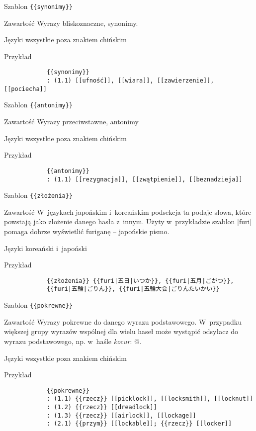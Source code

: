 \spacer
\begin{opis}
	\item[Szablon] \verb|{{synonimy}}|
	\item[Zawartość] Wyrazy bliskoznaczne, synonimy.
	\item[Języki] wszystkie poza znakiem chińskim
	\item[Przykład]
		\begin{verbatim}
			{{synonimy}}
			: (1.1) [[ufność]], [[wiara]], [[zawierzenie]], [[pociecha]]
		\end{verbatim}
\end{opis}
\spacer
\begin{opis}
	\item[Szablon] \verb|{{antonimy}}|
	\item[Zawartość] Wyrazy przeciwstawne, antonimy
	\item[Języki] wszystkie poza znakiem chińskim
	\item[Przykład]
		\begin{verbatim}
			{{antonimy}}
			: (1.1) [[rezygnacja]], [[zwątpienie]], [[beznadzieja]]
		\end{verbatim}
\end{opis}
\spacer
\begin{opis}
	\item[Szablon] \verb|{{złożenia}}|
	\item[Zawartość] W~językach japońskim i~koreańskim podsekcja ta podaje słowa, które powstają jako złożenie danego hasła z~innym. Użyty w~przykładzie szablon \kod|{{furi}}| pomaga dobrze wyświetlić furiganę -- japońskie pismo.
	\item[Języki] koreański i~japoński
	\item[Przykład]
		\begin{verbatim}
			{{złożenia}} {{furi|五日|いつか}}, {{furi|五月|ごがつ}},
			{{furi|五輪|ごりん}}, {{furi|五輪大会|ごりんたいかい}}
		\end{verbatim}
\end{opis}
\spacer
\begin{opis}
	\item[Szablon] \verb|{{pokrewne}}|
	\item[Zawartość] Wyrazy pokrewne do danego wyrazu podstawowego. W~przypadku większej grupy wyrazów wspólnej dla wielu haseł może wystąpić odsyłacz do wyrazu podstawowego, np. w~haśle \emph{kocur}: @.
	\item[Języki] wszystkie poza znakiem chińskim
	\item[Przykład]
		\begin{verbatim}
			{{pokrewne}}
			: (1.1) {{rzecz}} [[picklock]], [[locksmith]], [[locknut]]
			: (1.2) {{rzecz}} [[dreadlock]]
			: (1.3) {{rzecz}} [[airlock]], [[lockage]]
			: (2.1) {{przym}} [[lockable]]; {{rzecz}} [[locker]]
		\end{verbatim}
\end{opis}
